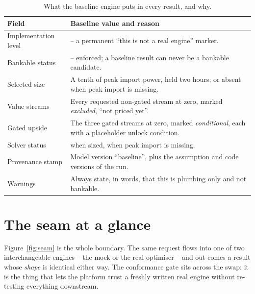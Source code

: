 \begin{table}[H]
\centering
\caption{What the baseline engine puts in every result, and why.}
\label{tab:baseline}
\small\sffamily
\begin{tabularx}{\textwidth}{@{}l L@{}}
\toprule
\textbf{Field} & \textbf{Baseline value and reason} \\
\midrule
Implementation level &  -- a permanent ``this is not a real engine'' marker. \\
Bankable status &  -- enforced; a baseline result can never be a bankable candidate. \\
Selected size & A tenth of peak import power, held two hours; or absent when peak import is missing. \\
Value streams & Every requested non-gated stream at zero, marked \emph{excluded}, ``not priced yet''. \\
Gated upside & The three gated streams at zero, marked \emph{conditional}, each with a placeholder unlock condition. \\
Solver status &  when sized,  when peak import is missing. \\
Provenance stamp & Model version ``baseline'', plus the assumption and code versions of the run. \\
Warnings & Always state, in words, that this is plumbing only and not bankable. \\
\bottomrule
\end{tabularx}
\end{table}

\section{The seam at a glance}

Figure~\ref{fig:seam} is the whole boundary. The same request flows into one of two interchangeable engines -- the mock or the real optimiser -- and out comes a result whose \emph{shape} is identical either way. The conformance gate sits across the swap: it is the thing that lets the platform trust a freshly written real engine without re-testing everything downstream.

